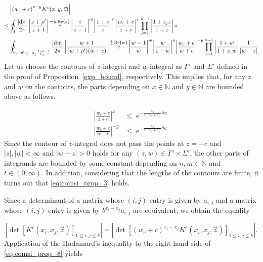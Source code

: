\documentclass[cmp]{svjour}
\numberwithin{theorem}{section}
\numberwithin{equation}{section}
\DeclareMathOperator{\e}{e}
\def\dd{{\rm d}}
\begin{document}
\begin{equation*}
\begin{split}
 \label{eq:comsi_prop_4}
& \left| {(w_c + c)}^{x - y} K^c(x,y,\vec{z}) \right| \\
\leq & \oint_{1} \frac{ \left| \dd z \right| }{2 \pi } \left| \frac{z + \rho'}{z + 1} \right| \e^{ - \frac{t}{2} \Re{z} } {\left| \frac{z}{z - 1} \right|}^m {\left| \frac{1 + z}{z} \right|}^n {\left| \frac{w_c + c}{z + c} \right|}^x \prod_{j=1}^{n-1}{ \left| \frac{1 + z_j z}{1 + z} \right| } \times \\
& \oint_{0 , - \rho' ,  \{ - z_j^{-1} \}_{j=1}^{n-1} } \frac{ \left| \dd w \right| }{2 \pi} \left| \frac{w + 1}{(w + \rho')(w + c )} \right| \e^{ \frac{t}{2} \Re{w} } {\left| \frac{w - 1}{w} \right|}^m {\left| \frac{w}{1 + w} \right|}^n {\left| \frac{w_c + c}{w + c} \right|}^{-y}   \prod_{j=1}^{n-1}{ \left| \frac{1 + w}{1 + z_j w} \right| } \frac{1}{ \left| w-z \right| }
\end{split}
\end{equation*}
Let us choose the contours of $z$-integral and $w$-integral as $\Gamma'$ and $\Sigma'$ defined in the proof of Proposition~\ref{exp_bound}, respectively. 
This implies that, for any $z$ and $w$ on the contours, the parts depending on $x \in \mathbb{N}$ and $y \in \mathbb{N}$ are bounded above as follows.

\begin{align*}
{\left| \frac{w_c + c}{z + c} \right|}^x & \leq \e^{  - \frac{w_c}{4(w_c + c)} \delta x }  \label{eq:comsi_prop_6} \\
{\left| \frac{w_c + c}{w + c} \right|}^{-y} & \leq \e^{  - \frac{w_c}{4(w_c + c)} \delta y } 
\end{align*}
Since the contour of $z$-integral does not pass the points at $z=-c$ and  $|z|, |w| < \infty$ and $|w - z| > 0$ holds for any $(z,w) \in \Gamma' \times \Sigma'$, the other parts of integrands are bounded by some constant depending on $n, m \in \mathbb{N}$ and $t \in (0,\infty)$. 
In addition, considering that the lengths of the contours are finite, it turns out that \eqref{eq:comsi_prop_3} holds.


Since a determinant of a matrix whose $(i,j)$ entry is given by $a_{i,j}$ and a matrix whose $(i,j)$ entry is given by $b^{x_i - x_j} a_{i,j}$ are equivalent, we obtain the equality

\begin{equation}
\label{eq:comsi_prop_8}
\left| \det\left[ K^c(x_i , x_j , \vec{z}) \right]_{1 \leq i , j \leq k }   \right| =  \left| \det\left[ {(w_c + c)}^{x_i - x_j} K^c(x_i , x_j , \vec{z}) \right]_{1 \leq i , j \leq k }   \right|.
\end{equation}
Application of the Hadamard's inequality to the right hand side of \eqref{eq:comsi_prop_8} yields
\end{document}

